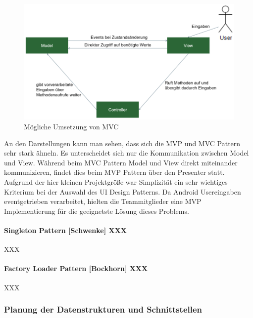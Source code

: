 \begin{figure}[!h]
	\includegraphics[width=1\columnwidth]{img/design-pattern-moeglich-mvc}
	\caption[Mögliche Umsetzung von MVC]{Mögliche Umsetzung von MVC\footnotemark}
\end{figure}


An den Darstellungen kann man sehen, dass sich die MVP und MVC Pattern sehr stark ähneln. Es unterscheidet sich nur die Kommunikation zwischen Model und View. Während beim MVC Pattern Model und View direkt miteinander kommunizieren, findet dies beim MVP Pattern über den Presenter statt. Aufgrund der hier kleinen Projektgröße war Simplizität ein sehr wichtiges Kriterium bei der Auswahl des UI Design Patterns. Da Android Usereingaben eventgetrieben verarbeitet, hielten die Teammitglieder eine MVP Implementierung für die geeignetste Lösung dieses Problems.

\clearpage

\paragraph{Singleton Pattern [Schwenke] XXX}

XXX

\clearpage

\paragraph{Factory Loader Pattern [Bockhorn] XXX}

XXX

\clearpage

\subsubsection{Planung der Datenstrukturen und Schnittstellen}

